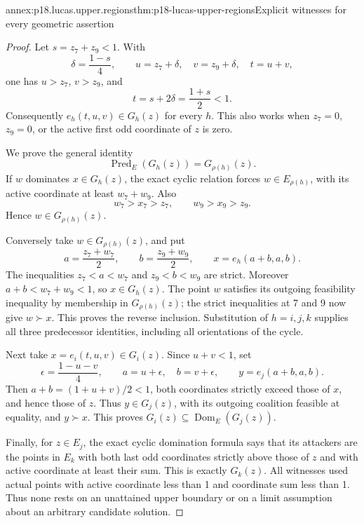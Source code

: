 \begin{annexitem}{annex:p18.lucas.upper.regions}{thm:p18-lucas-upper-regions}{Explicit witnesses for every geometric assertion}
\begin{proof}
Let \(s=z_7+z_9<1\). With
\[
 \delta=\frac{1-s}{4},\qquad
 u=z_7+\delta,\quad v=z_9+\delta,\quad t=u+v,
\]
one has \(u>z_7\), \(v>z_9\), and
\[
                         t=s+2\delta=\frac{1+s}{2}<1.
\]
Consequently \(e_h(t,u,v)\in G_h(z)\) for every \(h\).
This also works when \(z_7=0\), \(z_9=0\), or the
active first odd coordinate of \(z\) is zero.

We prove the general identity
\[
                     \operatorname{Pred}_E(G_h(z))
                                               =G_{\rho(h)}(z).
\]
If \(w\) dominates \(x\in G_h(z)\), the exact cyclic
relation forces \(w\in E_{\rho(h)}\), with its active
coordinate at least \(w_7+w_9\). Also
\[
                        w_7>x_7>z_7,\qquad
                        w_9>x_9>z_9.
\]
Hence \(w\in G_{\rho(h)}(z)\).

Conversely take \(w\in G_{\rho(h)}(z)\), and put
\[
             a=\frac{z_7+w_7}{2},\qquad
             b=\frac{z_9+w_9}{2},\qquad x=e_h(a+b,a,b).
\]
The inequalities \(z_7<a<w_7\) and \(z_9<b<w_9\) are strict.
Moreover \(a+b<w_7+w_9<1\), so \(x\in G_h(z)\).
The point \(w\) satisfies its outgoing feasibility
inequality by membership in \(G_{\rho(h)}(z)\);
the strict inequalities at 7 and 9 now give \(w\succ x\).
This proves the reverse inclusion. Substitution of
\(h=i,j,k\) supplies all three predecessor identities,
including all orientations of the cycle.

Next take \(x=e_i(t,u,v)\in G_i(z)\). Since \(u+v<1\), set
\[
 \epsilon=\frac{1-u-v}{4},\qquad
 a=u+\epsilon,\quad b=v+\epsilon,\qquad
                         y=e_j(a+b,a,b).
\]
Then \(a+b=(1+u+v)/2<1\), both coordinates strictly
exceed those of \(x\), and hence those of \(z\).
Thus \(y\in G_j(z)\), with its outgoing coalition
feasible at equality, and \(y\succ x\).
This proves \(G_i(z)\subseteq\operatorname{Dom}_E(G_j(z))\).

Finally, for \(z\in E_j\), the exact cyclic domination
formula says that its attackers are the points in
\(E_k\) with both last odd coordinates strictly above
those of \(z\) and with active coordinate at least their
sum. This is exactly \(G_k(z)\).
All witnesses used actual points with active coordinate
less than 1 and coordinate sum less than 1. Thus none
rests on an unattained upper boundary or on a limit
assumption about an arbitrary candidate solution.
\end{proof}
\end{annexitem}

